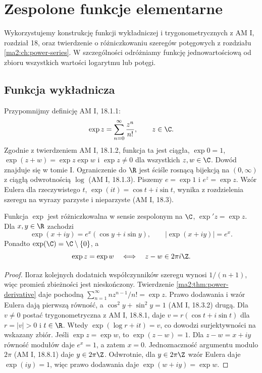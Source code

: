 \chapter{Zespolone funkcje elementarne}
\label{ma2:ch:complex-elementary}

Wykorzystujemy konstrukcję funkcji wykładniczej i trygonometrycznych z AM I,
rozdział 18, oraz twierdzenie o różniczkowaniu szeregów potęgowych
z rozdziału \ref{ma2:ch:power-series}. W szczególności odróżniamy funkcję
jednowartościową od zbioru wszystkich wartości logarytmu lub potęgi.

\section{Funkcja wykładnicza}

Przypomnijmy definicję AM I, 18.1.1:
\[
 \exp z=\sum_{n=0}^\infty\frac{z^n}{n!},\qquad z\in\C.
\]
Zgodnie z twierdzeniem AM I, 18.1.2, funkcja ta jest ciągła,
$\exp0=1$, $\exp(z+w)=\exp z\exp w$ i $\exp z\ne0$ dla wszystkich
$z,w\in\C$. Dowód znajduje się w tomie I. Ograniczenie do $\R$
jest ściśle rosnącą bijekcją na $(0,\infty)$ z ciągłą odwrotnością $\log$
(AM I, 18.1.3). Piszemy $e=\exp 1$ i $e^z=\exp z$. Wzór Eulera dla rzeczywistego $t$,
$\exp(it)=\cos t+i\sin t$, wynika z rozdzielenia szeregu na wyrazy
parzyste i nieparzyste (AM I, 18.3).

\begin{twierdzenie}
\label{ma2:thm:complex-exp}
Funkcja $\exp$ jest różniczkowalna w sensie zespolonym na $\C$,
$\exp' z=\exp z$. Dla $x,y\in\R$ zachodzi
\[
 \exp(x+iy)=e^x(\cos y+i\sin y),\qquad |\exp(x+iy)|=e^x.
\]
Ponadto $\exp(\C)=\C\setminus\{0\}$, a
\[
 \exp z=\exp w\quad\Longleftrightarrow\quad z-w\in2\pi i\Z.
\]
\end{twierdzenie}
\begin{proof}
Iloraz kolejnych dodatnich współczynników szeregu wynosi $1/(n+1)$,
więc promień zbieżności jest nieskończony. Twierdzenie
\ref{ma2:thm:power-derivative} daje pochodną
$\sum_{n=1}^\infty nz^{n-1}/n!=\exp z$.
Prawo dodawania i wzór Eulera dają pierwszą równość, a
$\cos^2y+\sin^2y=1$ (AM I, 18.3.2) drugą.
Dla $v\ne0$ postać trygonometryczna z AM I, 18.8.1, daje
$v=r(\cos t+i\sin t)$ dla $r=|v|>0$ i $t\in\R$.
Wtedy $\exp(\log r+it)=v$, co dowodzi surjektywności na wskazany zbiór.
Jeśli $\exp z=\exp w$, to $\exp(z-w)=1$. Dla $z-w=x+iy$
równość modułów daje $e^x=1$, a zatem $x=0$. Jednoznaczność
argumentu modulo $2\pi$ (AM I, 18.8.1) daje $y\in2\pi\Z$.
Odwrotnie, dla $y\in2\pi\Z$ wzór Eulera daje $\exp(iy)=1$,
więc prawo dodawania daje $\exp(w+iy)=\exp w$.
\end{proof}

